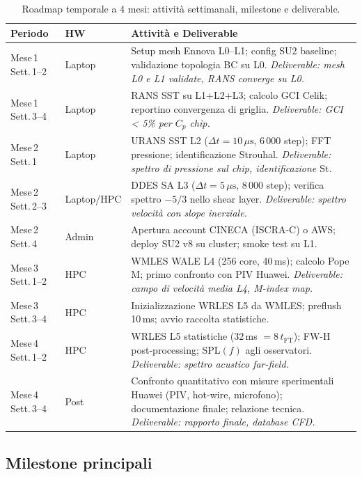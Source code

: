 \documentclass[11pt,a4paper]{article}
\newcommand{\Str}{\mathrm{St}}
\newcommand{\mus}{\,\mu\mathrm{s}}
\newcommand{\tFT}{t_{\mathrm{FT}}}
\begin{document}
\begin{table}[H]
  \centering
  \caption{Roadmap temporale a 4 mesi: attività settimanali, milestone e deliverable.}
  \label{tab:roadmap}
  \begin{tabularx}{\textwidth}{p{2.2cm}lX}
    \toprule
    \rowcolor{tablehead}
    \textbf{Periodo} & \textbf{HW} & \textbf{Attività e Deliverable} \\
    \midrule
    Mese\,1 Sett.\,1--2 & Laptop & Setup mesh Ennova L0--L1; config SU2 baseline; validazione topologia BC su L0. \textit{Deliverable: mesh L0 e L1 validate, RANS converge su L0.} \\
    Mese\,1 Sett.\,3--4 & Laptop & RANS SST su L1+L2+L3; calcolo GCI Celik; reportino convergenza di griglia. \textit{Deliverable: GCI < 5\% per $C_p$ chip.} \\
    Mese\,2 Sett.\,1 & Laptop & URANS SST L2 ($\Delta t = 10\mus$, 6\,000 step); FFT pressione; identificazione Strouhal. \textit{Deliverable: spettro di pressione sul chip, identificazione $\Str$.} \\
    Mese\,2 Sett.\,2--3 & Laptop/HPC & DDES SA L3 ($\Delta t = 5\mus$, 8\,000 step); verifica spettro $-5/3$ nello shear layer. \textit{Deliverable: spettro velocità con slope inerziale.} \\
    Mese\,2 Sett.\,4 & Admin & Apertura account CINECA (ISCRA-C) o AWS; deploy SU2 v8 su cluster; smoke test su L1. \\
    Mese\,3 Sett.\,1--2 & HPC & WMLES WALE L4 (256 core, 40\,ms); calcolo Pope M; primo confronto con PIV Huawei. \textit{Deliverable: campo di velocità media L4, M-index map.} \\
    Mese\,3 Sett.\,3--4 & HPC & Inizializzazione WRLES L5 da WMLES; preflush 10\,ms; avvio raccolta statistiche. \\
    Mese\,4 Sett.\,1--2 & HPC & WRLES L5 statistiche (32\,ms $= 8\,\tFT$); FW-H post-processing; SPL$(f)$ agli osservatori. \textit{Deliverable: spettro acustico far-field.} \\
    Mese\,4 Sett.\,3--4 & Post & Confronto quantitativo con misure sperimentali Huawei (PIV, hot-wire, microfono); documentazione finale; relazione tecnica. \textit{Deliverable: rapporto finale, database CFD.} \\
    \bottomrule
  \end{tabularx}
\end{table}

\subsection{Milestone principali}
\end{document}
